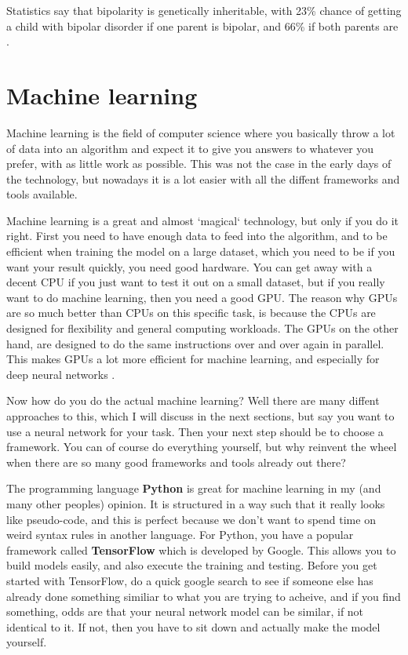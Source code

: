 Statistics say that bipolarity is genetically inheritable, with 23\% chance of getting a child with bipolar disorder 
if one parent is bipolar, and 66\% if both parents are \cite{bipolar_statistics}. 


\newpage
\section{Machine learning}
Machine learning is the field of computer science where you basically throw a lot of data into an algorithm
and expect it to give you answers to whatever you prefer, with as little work as possible. 
This was not the case in the early days of the technology, but nowadays it is a lot easier with all the diffent 
frameworks and tools available.

Machine learning is a great and almost `magical` technology, but only if you do it right.
First you need to have enough data to feed into the algorithm, and to be efficient when training the model on a 
large dataset, which you need to be if you want your result quickly, you need good hardware. You can get away with a 
decent CPU if you just want to test it out on a small dataset, but if you really want to do machine learning,
then you need a good GPU. The reason why GPUs are so much better than CPUs on this specific task, 
is because the CPUs are designed for flexibility and general computing workloads. The GPUs on the other hand, 
are designed to do the same instructions over and over again in parallel. This makes GPUs a lot more efficient for 
machine learning, and especially for deep neural networks \cite{cpu_vs_gpu_ml}. 

Now how do you do the actual machine learning? Well there are many diffent approaches to this, which I will discuss 
in the next sections, but say you want to use a neural network for your task. Then your next step should be to 
choose a framework. You can of course do everything yourself, but why reinvent the wheel when there are so many good 
frameworks and tools already out there? 

The programming language \textbf{Python} is great for machine learning in my (and many other peoples) opinion. 
It is structured in a way such that it really looks like pseudo-code, and this is perfect because we don't want to 
spend time on weird syntax rules in another language. For Python, you have a popular framework called \textbf{TensorFlow} 
which is developed by Google. This allows you to build models easily, and also execute the training and testing. 
Before you get started with TensorFlow, do a quick google search to see if someone else has already done something 
similiar to what you are trying to acheive, and if you find something, odds are that your neural network model can be 
similar, if not identical to it. If not, then you have to sit down and actually make the model yourself. 

